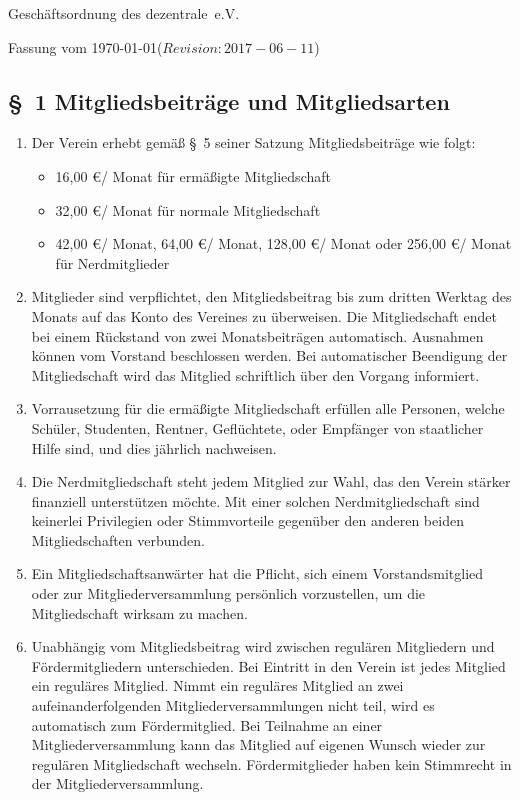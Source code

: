 \documentclass[10pt,a4paper]{article}
\newcommand{\name}{dezentrale}
\newcommand{\revision}{$Revision: 2017-06-11$}
\begin{document}
{\LARGE Gesch{\"a}ftsordnung des \name\ e.V.}

Fassung vom \today (\revision)
%
%
\subsection*{\S \ 1 Mitgliedsbeitr{\"a}ge und Mitgliedsarten}
\begin{enumerate}
\item Der Verein erhebt gem{\"a}{\ss} \S \ 5 seiner Satzung Mitgliedsbeitr{\"a}ge wie folgt:
	\begin{itemize}
    \item 16,00 \euro / Monat f{\"u}r erm{\"a}{\ss}igte Mitgliedschaft
    \item 32,00 \euro / Monat f{\"u}r normale Mitgliedschaft
	\item 42,00 \euro / Monat, 64,00 \euro / Monat, 128,00 \euro / Monat oder 256,00 \euro / Monat f{\"u}r Nerdmitglieder
	\end{itemize}
    

    \item Mitglieder sind verpflichtet, den Mitgliedsbeitrag bis zum dritten Werktag des Monats
    auf das Konto des Vereines zu {\"u}berweisen. Die Mitgliedschaft endet bei einem R{\"u}ckstand
    von zwei Monatsbeitr{\"a}gen automatisch. Ausnahmen k{\"o}nnen vom Vorstand beschlossen werden.
    Bei automatischer Beendigung der Mitgliedschaft wird das Mitglied schriftlich {\"u}ber den
    Vorgang informiert.

    \item Vorrausetzung f{\"u}r die erm{\"a}{\ss}igte Mitgliedschaft erf{\"u}llen alle Personen, welche Sch{\"u}ler, Studenten,
    Rentner, Gefl{\"u}chtete, oder Empf{\"a}nger von staatlicher Hilfe sind, und dies j{\"a}hrlich nachweisen.

\item Die Nerdmitgliedschaft steht jedem Mitglied zur Wahl, das den Verein st{\"a}rker
	finanziell unterst{\"u}tzen m{\"o}chte. Mit einer solchen
	Nerdmitgliedschaft sind keinerlei Privilegien oder Stimmvorteile gegen{\"u}ber
	den anderen beiden Mitgliedschaften verbunden.
    
    \item Ein Mitgliedschaftsanw{\"a}rter hat die Pflicht, sich einem Vorstandsmitglied oder zur 
    Mitgliederversammlung pers{\"o}nlich vorzustellen, um die Mitgliedschaft wirksam zu machen.
    \item Unabh{\"a}ngig vom Mitgliedsbeitrag wird zwischen regul{\"a}ren Mitgliedern und F{\"o}rdermitgliedern
    unterschieden. Bei Eintritt in den Verein ist jedes Mitglied ein regul{\"a}res Mitglied.
    Nimmt ein regul{\"a}res Mitglied an zwei aufeinanderfolgenden Mitgliederversammlungen nicht
    teil, wird es automatisch zum F{\"o}rdermitglied. Bei Teilnahme an einer Mitgliederversammlung
    kann das Mitglied auf eigenen Wunsch wieder zur regul{\"a}ren Mitgliedschaft wechseln.
    F{\"o}rdermitglieder haben kein Stimmrecht in der Mitgliederversammlung.


\end{enumerate}
\end{document}
